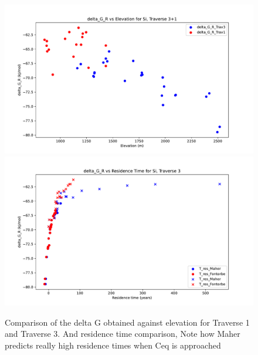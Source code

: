\begin{figure}[h]
    \centering
    \includegraphics[width=\textwidth]{delta_G_R_Si_comparison_Trav1.pdf}
    \includegraphics[width=\textwidth]{delta_G_R_Si_time_trav1.pdf}
    \caption{Comparison of the delta G obtained against elevation for Traverse 1 and Traverse 3. And residence time comparison, Note how Maher predicts really high residence times when Ceq is approached}
    \label{fig:discussion9}
\end{figure}

\FloatBarrier







\FloatBarrier


